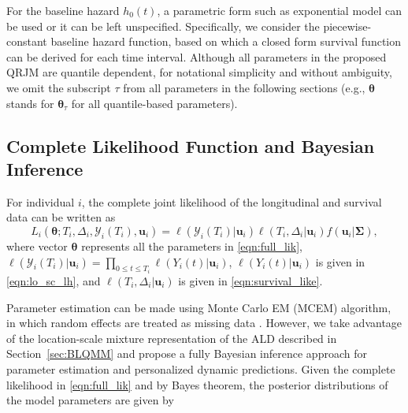 \documentclass[Crown, sagev, times, doublespace]{sagej}
\begin{document}
For the baseline hazard $h_0(t)$, a parametric form such as exponential model can be used or it can be left unspecified. Specifically, we consider the piecewise-constant baseline hazard function, based on which a closed form survival function can be derived for each time interval. Although all parameters in the proposed QRJM are quantile dependent, for notational simplicity and without ambiguity, we omit the subscript $\tau$ from all parameters in the following sections (e.g., $\boldsymbol{\theta}$ stands for $\boldsymbol{\theta}_{\tau}$ for all quantile-based parameters).


\subsection{Complete Likelihood Function and Bayesian Inference}\label{sec:estimation}
For individual $i$, the complete joint likelihood of the longitudinal and survival data can be written as
\begin{equation}\label{eqn:full_lik}
L_i(\boldsymbol{\theta};T_i, \Delta_i, \mathcal{Y}_{i}(T_i), \boldsymbol{u}_i) = \ell(\mathcal{Y}_{i}(T_i)|\boldsymbol{u}_i)\ell(T_i, \Delta_i|\boldsymbol{u}_i)f(\boldsymbol{u}_i|\boldsymbol{\Sigma}),
\end{equation}
where vector $\boldsymbol{\theta}$ represents all the parameters in \eqref{eqn:full_lik},  $\ell(\mathcal{Y}_{i}(T_i)|\boldsymbol{u}_i)=\prod_{0\le t\le T_i}\ell(Y_{i}(t)|\boldsymbol{u}_i)$, $\ell(Y_{i}(t)|\boldsymbol{u}_i)$ is given in \eqref{eqn:lo_sc_lh}, and $\ell(T_i, \Delta_i|\boldsymbol{u}_i)$ is given in \eqref{eqn:survival_like}.

Parameter estimation can be made using Monte Carlo EM (MCEM) algorithm, in which random effects are treated as missing data \citep{farcomeni2015longitudinal}. However, we take advantage of the location-scale mixture representation of the ALD described in Section~\ref{sec:BLQMM} and propose a fully Bayesian inference approach for parameter estimation and personalized dynamic predictions. Given the complete likelihood in \eqref{eqn:full_lik} and by Bayes theorem, the posterior distributions of the model parameters are given by
\end{document}

